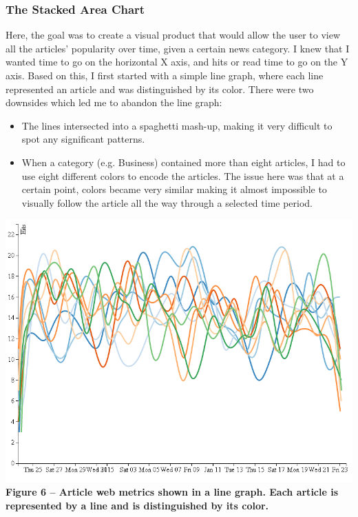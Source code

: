 \documentclass[12pt]{article}
\begin{document}
{\subsubsection{The Stacked Area Chart}

Here, the goal was to create a visual product that would allow the user to view all the articles' popularity over time, given a certain news category. I knew that I wanted time to go on the horizontal X axis, and hits or read time to go on the Y axis. Based on this, I first started with a simple line graph, where each line represented an article and was distinguished by its color. There were two downsides which led me to abandon the line graph: 
\begin{itemize}
\item The lines intersected into a spaghetti mash-up, making it very difficult to spot any significant patterns.
\item When a category (e.g. Business) contained more than eight articles, I had to use eight different colors to encode the articles. The issue here was that at a certain point, colors became very similar making it almost impossible to visually follow the article all the way through a selected time period.
\end{itemize}

\noindent\includegraphics[scale=0.65]{img/lines} \\
\noindent\textbf{Figure 6 -- Article web metrics shown in a line graph. Each article is represented by a line and is distinguished by its color.} \\ 

}
\end{document}
